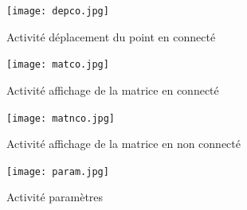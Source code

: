 \documentclass[a4paper,12pt]{report}
\begin{document}
		\begin{figure}[H]
			\centering
				\texttt{[image: depco.jpg]}
				\caption{Activité déplacement du point en connecté}
		\end{figure}
		
		\begin{figure}[H]
			\centering
				\texttt{[image: matco.jpg]}
				\caption{Activité affichage de la matrice en connecté}
		\end{figure}
		
		\begin{figure}[H]
			\centering
				\texttt{[image: matnco.jpg]}
				\caption{Activité affichage de la matrice en non connecté}
		\end{figure}
		
		\begin{figure}[H]
			\centering
				\texttt{[image: param.jpg]}
				\caption{Activité paramètres}
		\end{figure}

	\clearpage
\end{document}
